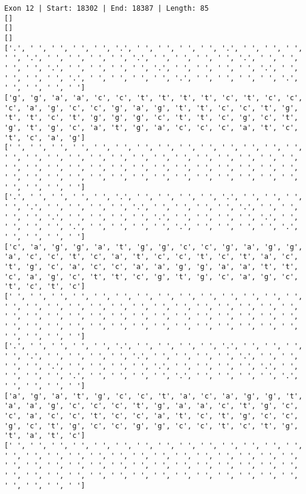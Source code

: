 \documentclass{article}
\begin{document}
\begin{Verbatim}
Exon 12 | Start: 18302 | End: 18387 | Length: 85
[]
[]
[]
['.', ' ', ' ', ' ', ' ', '.', ' ', ' ', ' ', ' ', '.', ' ', ' ', ' ', ' ', '.', ' ', ' ', ' ', ' ', '.', ' ', ' ', ' ', ' ', '.', ' ', ' ', ' ', ' ', '.', ' ', ' ', ' ', ' ', '.', ' ', ' ', ' ', ' ', '.', ' ', ' ', ' ', ' ', '.', ' ', ' ', ' ', ' ', '.', ' ', ' ', ' ', ' ', '.', ' ', ' ', ' ', ' ']
['g', 'g', 'a', 'a', 'c', 'c', 't', 't', 't', 't', 'c', 't', 'c', 'c', 'c', 'a', 'g', 'c', 'c', 'g', 'a', 'g', 't', 't', 'c', 'c', 't', 'g', 't', 't', 'c', 't', 'g', 'g', 'g', 'c', 't', 't', 'c', 'g', 'c', 't', 'g', 't', 'g', 'c', 'a', 't', 'g', 'a', 'c', 'c', 'c', 'a', 't', 'c', 't', 'c', 'a', 'g']
[' ', ' ', ' ', ' ', ' ', ' ', ' ', ' ', ' ', ' ', ' ', ' ', ' ', ' ', ' ', ' ', ' ', ' ', ' ', ' ', ' ', ' ', ' ', ' ', ' ', ' ', ' ', ' ', ' ', ' ', ' ', ' ', ' ', ' ', ' ', ' ', ' ', ' ', ' ', ' ', ' ', ' ', ' ', ' ', ' ', ' ', ' ', ' ', ' ', ' ', ' ', ' ', ' ', ' ', ' ', ' ', ' ', ' ', ' ', ' ']
['.', ' ', ' ', ' ', ' ', '.', ' ', ' ', ' ', ' ', '.', ' ', ' ', ' ', ' ', '.', ' ', ' ', ' ', ' ', '.', ' ', ' ', ' ', ' ', '.', ' ', ' ', ' ', ' ', '.', ' ', ' ', ' ', ' ', '.', ' ', ' ', ' ', ' ', '.', ' ', ' ', ' ', ' ', '.', ' ', ' ', ' ', ' ', '.', ' ', ' ', ' ', ' ', '.', ' ', ' ', ' ', ' ']
['c', 'a', 'g', 'g', 'a', 't', 'g', 'g', 'c', 'c', 'g', 'a', 'g', 'g', 'a', 'c', 'c', 't', 'c', 'a', 't', 'c', 'c', 't', 'c', 't', 'a', 'c', 't', 'g', 'c', 'a', 'c', 'c', 'a', 'a', 'g', 'g', 'a', 'a', 't', 't', 'c', 'a', 'g', 'c', 't', 't', 'c', 'g', 't', 'g', 'c', 'a', 'g', 'c', 't', 'c', 't', 'c']
[' ', ' ', ' ', ' ', ' ', ' ', ' ', ' ', ' ', ' ', ' ', ' ', ' ', ' ', ' ', ' ', ' ', ' ', ' ', ' ', ' ', ' ', ' ', ' ', ' ', ' ', ' ', ' ', ' ', ' ', ' ', ' ', ' ', ' ', ' ', ' ', ' ', ' ', ' ', ' ', ' ', ' ', ' ', ' ', ' ', ' ', ' ', ' ', ' ', ' ', ' ', ' ', ' ', ' ', ' ', ' ', ' ', ' ', ' ', ' ']
['.', ' ', ' ', ' ', ' ', '.', ' ', ' ', ' ', ' ', '.', ' ', ' ', ' ', ' ', '.', ' ', ' ', ' ', ' ', '.', ' ', ' ', ' ', ' ', '.', ' ', ' ', ' ', ' ', '.', ' ', ' ', ' ', ' ', '.', ' ', ' ', ' ', ' ', '.', ' ', ' ', ' ', ' ', '.', ' ', ' ', ' ', ' ', '.', ' ', ' ', ' ', ' ', '.', ' ', ' ', ' ', ' ']
['a', 'g', 'a', 't', 'g', 'c', 'c', 't', 'a', 'c', 'a', 'g', 'g', 't', 'a', 'a', 'g', 'c', 'c', 'c', 't', 'g', 'a', 'a', 'c', 't', 'g', 'c', 'c', 'a', 'c', 'c', 't', 'c', 'c', 'a', 't', 'c', 't', 'g', 'c', 'c', 'g', 'c', 't', 'g', 'c', 'c', 'g', 'g', 'c', 'c', 't', 'c', 't', 'g', 't', 'a', 't', 'c']
[' ', ' ', ' ', ' ', ' ', ' ', ' ', ' ', ' ', ' ', ' ', ' ', ' ', ' ', ' ', ' ', ' ', ' ', ' ', ' ', ' ', ' ', ' ', ' ', ' ', ' ', ' ', ' ', ' ', ' ', ' ', ' ', ' ', ' ', ' ', ' ', ' ', ' ', ' ', ' ', ' ', ' ', ' ', ' ', ' ', ' ', ' ', ' ', ' ', ' ', ' ', ' ', ' ', ' ', ' ', ' ', ' ', ' ', ' ', ' ']

\end{Verbatim}
\end{document}
